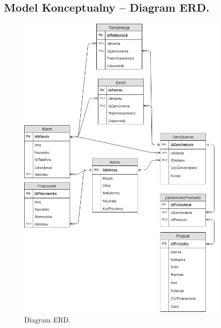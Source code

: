 \documentclass[a4paper,11pt]{article}
\begin{document}
\subsection {Model Konceptualny – Diagram ERD.}

\begin{figure}[H]
	\centering
		\includegraphics[width=0.9\textwidth]{Diagramy/DFD0-Baza-Danych.png}
	\caption{Diagram ERD.}
\end{figure}
\end{document}
